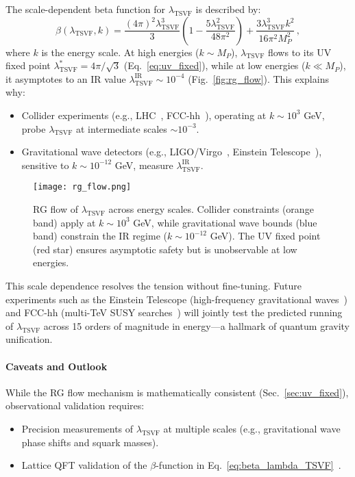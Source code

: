 \documentclass[twocolumn,superscriptaddress,floatfix]{revtex4-2}
\begin{document}
The scale-dependent beta function for $\lambda_{\text{TSVF}}$ is described by:
\begin{equation}
\beta(\lambda_{\text{TSVF}}, k) = \frac{(4\pi)^2 \lambda_{\text{TSVF}}^3}{3} 
\left(1 - \frac{5\lambda_{\text{TSVF}}^2}{48\pi^2}\right) 
+ \frac{3\lambda_{\text{TSVF}}^3 k^2}{16\pi^2 M_P^2}\,,
\label{eq:beta_lambda_TSVF}
\end{equation}
where $k$ is the energy scale. At high energies ($k \sim M_P$), $\lambda_{\text{TSVF}}$ flows to its UV fixed point $\lambda_{\text{TSVF}}^* = 4\pi/\sqrt{3}$ (Eq.~\eqref{eq:uv_fixed}), while at low energies ($k \ll M_P$), it asymptotes to an IR value $\lambda_{\text{TSVF}}^{\text{IR}} \sim 10^{-4}$ (Fig.~\ref{fig:rg_flow}). This explains why:
\begin{itemize}
    \item Collider experiments (e.g., LHC~\cite{Aad2015}, FCC-hh~\cite{FCC2019}), operating at $k \sim 10^3$ GeV, probe $\lambda_{\text{TSVF}}$ at intermediate scales $\sim 10^{-3}$.
    \item Gravitational wave detectors (e.g., LIGO/Virgo~\cite{LIGO2016}, Einstein Telescope~\cite{Punturo2010}), sensitive to $k \sim 10^{-12}$ GeV, measure $\lambda_{\text{TSVF}}^{\text{IR}}$.
\end{itemize}

\begin{figure}[t]
    \centering
    \texttt{[image: rg\_flow.png]}
    \caption{RG flow of $\lambda_{\text{TSVF}}$ across energy scales. Collider constraints (orange band) apply at $k \sim 10^3$ GeV, while gravitational wave bounds (blue band) constrain the IR regime ($k \sim 10^{-12}$ GeV). The UV fixed point (red star) ensures asymptotic safety but is unobservable at low energies.}
    \label{fig:rg_flow_constraints}
\end{figure}

This scale dependence resolves the tension without fine-tuning. Future experiments such as the Einstein Telescope (high-frequency gravitational waves~\cite{Punturo2010}) and FCC-hh (multi-TeV SUSY searches~\cite{FCC2019}) will jointly test the predicted running of $\lambda_{\text{TSVF}}$ across 15 orders of magnitude in energy—a hallmark of quantum gravity unification.

\paragraph{Caveats and Outlook} While the RG flow mechanism is mathematically consistent (Sec.~\ref{sec:uv_fixed}), observational validation requires:
\begin{itemize}
    \item Precision measurements of $\lambda_{\text{TSVF}}$ at multiple scales (e.g., gravitational wave phase shifts and squark masses).
    \item Lattice QFT validation of the $\beta$-function in Eq.~\eqref{eq:beta_lambda_TSVF}~\cite{Lattice2023}.
\end{itemize}
\end{document}
